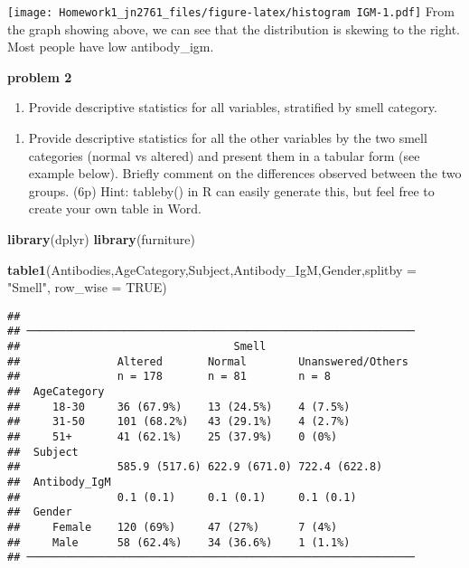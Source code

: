\documentclass[]{article}
\newenvironment{Shaded}{\begin{snugshade}}{\end{snugshade}}
\newcommand{\DataTypeTok}[1]{\textcolor[rgb]{0.13,0.29,0.53}{#1}}
\newcommand{\KeywordTok}[1]{\textcolor[rgb]{0.13,0.29,0.53}{\textbf{#1}}}
\newcommand{\NormalTok}[1]{#1}
\newcommand{\OtherTok}[1]{\textcolor[rgb]{0.56,0.35,0.01}{#1}}
\newcommand{\StringTok}[1]{\textcolor[rgb]{0.31,0.60,0.02}{#1}}
\providecommand{\tightlist}{%
  \setlength{\itemsep}{0pt}\setlength{\parskip}{0pt}}
\begin{document}
\texttt{[image: Homework1\_jn2761\_files/figure-latex/histogram IGM-1.pdf]}
From the graph showing above, we can see that the distribution is
skewing to the right. Most people have low antibody\_igm.

\textbf{problem 2}

\begin{enumerate}
\def\labelenumi{\arabic{enumi})}
\setcounter{enumi}{1}
\tightlist
\item
  Provide descriptive statistics for all variables, stratified by smell
  category.
\end{enumerate}

\begin{enumerate}
\def\labelenumi{\alph{enumi})}
\tightlist
\item
  Provide descriptive statistics for all the other variables by the two
  smell categories (normal vs altered) and present them in a tabular
  form (see example below). Briefly comment on the differences observed
  between the two groups. (6p) Hint: tableby() in R can easily generate
  this, but feel free to create your own table in Word.
\end{enumerate}

\begin{Shaded}
\begin{Highlighting}[]
\KeywordTok{library}\NormalTok{(dplyr)}
\KeywordTok{library}\NormalTok{(furniture)}

\KeywordTok{table1}\NormalTok{(Antibodies,AgeCategory,Subject,Antibody_IgM,Gender,}\DataTypeTok{splitby =} \StringTok{"Smell"}\NormalTok{,   }\DataTypeTok{row_wise =} \OtherTok{TRUE}\NormalTok{)}
\end{Highlighting}
\end{Shaded}

\begin{verbatim}
## 
## ────────────────────────────────────────────────────────────
##                                 Smell 
##               Altered       Normal        Unanswered/Others
##               n = 178       n = 81        n = 8            
##  AgeCategory                                               
##     18-30     36 (67.9%)    13 (24.5%)    4 (7.5%)         
##     31-50     101 (68.2%)   43 (29.1%)    4 (2.7%)         
##     51+       41 (62.1%)    25 (37.9%)    0 (0%)           
##  Subject                                                   
##               585.9 (517.6) 622.9 (671.0) 722.4 (622.8)    
##  Antibody_IgM                                              
##               0.1 (0.1)     0.1 (0.1)     0.1 (0.1)        
##  Gender                                                    
##     Female    120 (69%)     47 (27%)      7 (4%)           
##     Male      58 (62.4%)    34 (36.6%)    1 (1.1%)         
## ────────────────────────────────────────────────────────────
\end{verbatim}
\end{document}
